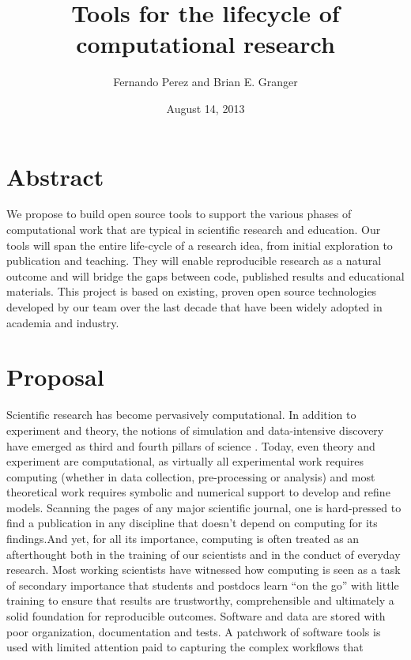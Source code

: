 \documentclass[letterpaper,10pt,english]{/Users/bgranger/Library/Python/2.7/lib/python/site-packages/sphinx/texinputs/sphinxhowto}
\title{Tools for the lifecycle of computational research}
\date{August 14, 2013}
\author{Fernando Perez and Brian E. Granger}
\begin{document}
        
            \maketitle
        

        
            \tableofcontents 
        

        
        \part{Abstract}We propose to build open source tools to support the various phases of
computational work that are typical in scientific research and
education. Our tools will span the entire life-cycle of a research idea,
from initial exploration to publication and teaching. They will enable
reproducible research as a natural outcome and will bridge the gaps
between code, published results and educational materials. This project
is based on existing, proven open source technologies developed by our
team over the last decade that have been widely adopted in academia and
industry.\part{Proposal}Scientific research has become pervasively computational. In addition to
experiment and theory, the notions of simulation and data-intensive
discovery have emerged as third and fourth pillars of science
\cite{4th-paradigm}. Today, even theory and experiment are
computational, as virtually all experimental work requires computing
(whether in data collection, pre-processing or analysis) and most
theoretical work requires symbolic and numerical support to develop and
refine models. Scanning the pages of any major scientific journal, one
is hard-pressed to find a publication in any discipline that doesn't
depend on computing for its findings.And yet, for all its importance, computing is often treated as an
afterthought both in the training of our scientists and in the conduct
of everyday research. Most working scientists have witnessed how
computing is seen as a task of secondary importance that students and
postdocs learn ``on the go'' with little training to ensure that results
are trustworthy, comprehensible and ultimately a solid foundation for
reproducible outcomes. Software and data are stored with poor
organization, documentation and tests. A patchwork of software tools is
used with limited attention paid to capturing the complex workflows that
\end{document}
